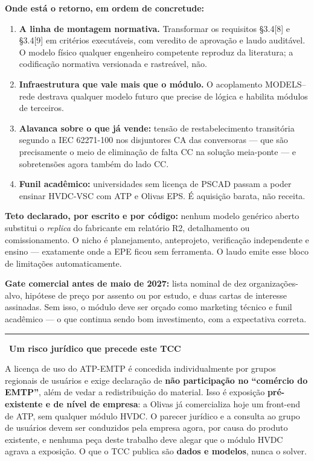\documentclass[12pt,a4paper]{article}
\newenvironment{destaque}[1]
  {\par\vspace{6pt}\begin{list}{}{%
     \setlength{\leftmargin}{0.8cm}\setlength{\rightmargin}{0cm}%
     \setlength{\labelwidth}{0pt}\setlength{\labelsep}{0pt}}%
   \item[]\textcolor{acento}{\rule[-1pt]{2pt}{10pt}}\ \textbf{#1}\par\vspace{2pt}\small}
  {\end{list}\vspace{6pt}}
\begin{document}
\noindent\textbf{Onde está o retorno, em ordem de concretude:}

\begin{enumerate}
  \item \textbf{A linha de montagem normativa.} Transformar os requisitos \S3.4[8] e \S3.4[9] em
        critérios executáveis, com veredito de aprovação e laudo auditável. O modelo físico qualquer
        engenheiro competente reproduz da literatura; a codificação normativa versionada e
        rastreável, não.
  \item \textbf{Infraestrutura que vale mais que o módulo.} O acoplamento MODELS--rede destrava
        qualquer modelo futuro que precise de lógica e habilita módulos de terceiros.
  \item \textbf{Alavanca sobre o que já vende:} tensão de restabelecimento transitória segundo a
        IEC 62271-100 nos disjuntores CA das conversoras --- que são precisamente o meio de
        eliminação de falta CC na solução meia-ponte --- e sobretensões agora também do lado CC.
  \item \textbf{Funil acadêmico:} universidades sem licença de PSCAD passam a poder ensinar HVDC-VSC
        com ATP e Olivas EPS. É aquisição barata, não receita.
\end{enumerate}

\textbf{Teto declarado, por escrito e por código:} nenhum modelo genérico aberto substitui o
\emph{replica} do fabricante em relatório R2, detalhamento ou comissionamento. O nicho é
planejamento, anteprojeto, verificação independente e ensino --- exatamente onde a EPE ficou sem
ferramenta. O laudo emite esse bloco de limitações automaticamente.

\textbf{Gate comercial antes de maio de 2027:} lista nominal de dez organizações-alvo, hipótese de
preço por assento ou por estudo, e duas cartas de interesse assinadas. Sem isso, o módulo deve ser
orçado como marketing técnico e funil acadêmico --- o que continua sendo bom investimento, com a
expectativa correta.

\begin{destaque}{Um risco jurídico que precede este TCC}
A licença de uso do ATP-EMTP é concedida individualmente por grupos regionais de usuários e exige
declaração de \textbf{não participação no \enquote{comércio do EMTP}}, além de vedar a
redistribuição do material. Isso é exposição \textbf{pré-existente e de nível de empresa}: a Olivas
já comercializa hoje um front-end de ATP, sem qualquer módulo HVDC. O parecer jurídico e a consulta
ao grupo de usuários devem ser conduzidos pela empresa agora, por causa do produto existente, e
nenhuma peça deste trabalho deve alegar que o módulo HVDC agrava a exposição. O que o TCC publica são
\textbf{dados e modelos}, nunca o solver.
\end{destaque}
\end{document}
